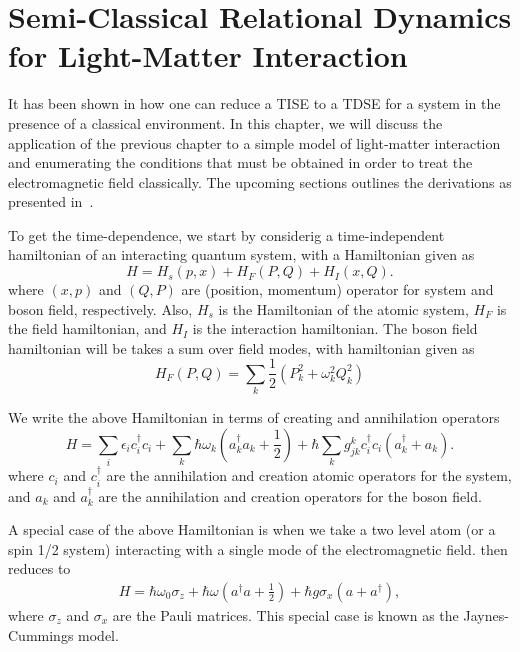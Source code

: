 \chapter{Semi-Classical Relational Dynamics for Light-Matter Interaction
\label{chap:braun_briggs_jaynes}}

It has been shown in  how one can reduce a TISE 
to a TDSE for a system in the presence of a classical environment. In this chapter, 
we will discuss the application of the previous chapter to a simple model of light-matter 
interaction and enumerating the conditions that must be obtained in order to treat the 
electromagnetic field classically. The upcoming sections outlines the derivations as presented 
in~\cite{braun2004classical}. 

To get the time-dependence, we start by considerig a time-independent hamiltonian of an interacting quantum system,
with a Hamiltonian given as
\begin{equation}
    H = H_s(p, x) + H_F(P, Q) + H_I(x, Q). 
\end{equation}
where $(x, p)$ and $(Q, P)$ are (position, momentum) operator for system and boson field, respectively. 
Also, $H_s$ is the Hamiltonian of the atomic system, $H_F$ is the field hamiltonian, and $H_I$ is the interaction hamiltonian. 
The boson field hamiltonian will be takes a sum over field modes, with hamiltonian given as 
\begin{equation}
    H_F(P, Q) = \sum_{k} \frac{1}{2}\left(P_k ^2 + \omega_k^2 Q_k^2\right)
\end{equation}

We write the above Hamiltonian in terms of creating and annihilation operators
\begin{equation}
    \label{eq:class_jcm_eq1}
    H = \sum_i \epsilon_i c^\dagger _i c _i + \sum_k \hbar \omega_k \left(a^\dagger _k a_k 
    + \frac{1}{2}\right) + \hbar\sum_k  g_{jk}^k c^\dagger _i c _i\left(a^\dagger _k + a_k \right).
\end{equation}
where $c_i$ and $c^\dagger _i$ are the annihilation and creation atomic operators for the system, 
and $a_k$ and $a^\dagger _k$ are the annihilation and creation operators for the boson field.

A special case of the above Hamiltonian is when we take a two level atom (or a spin 1/2 system)
interacting with a single mode of the electromagnetic field.  then reduces to
\begin{eqnarray}
    \label{eq:class_jcm_eq2}
    H = \hbar \omega_0 \sigma_z + \hbar \omega \left(a^\dagger a + \frac{1}{2}\right) 
    + \hbar g \sigma_x\left(a + a^\dagger\right),
\end{eqnarray}
where $\sigma_z$ and $\sigma_x$ are the Pauli matrices. 
This special case is known as the Jaynes-Cummings model.

